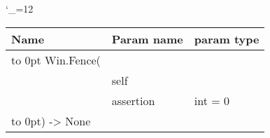 \begingroup \catcode`\_=12 \tt
\begin{tabular}{lll}
\toprule
\textrm{Name}&\textrm{Param name}&\textrm{param type}\\
\midrule
\hbox to 0pt {Win.Fence(\hss}\\
& self\\
& assertion & int = 0\\
\hbox to 0pt{) -> None\hss}\\
\bottomrule
\end{tabular}
\endgroup
